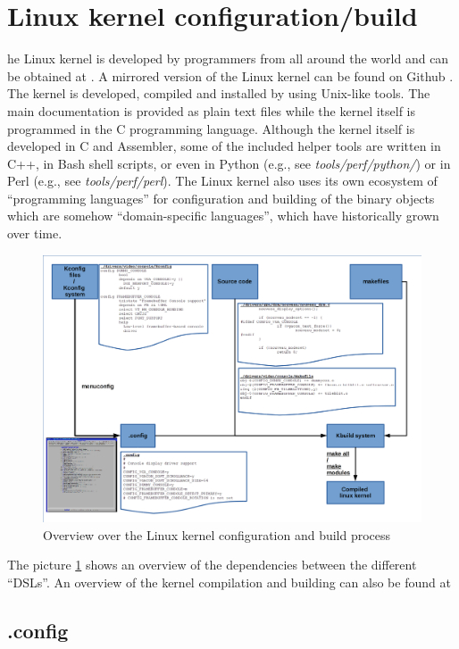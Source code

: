 \section{Linux kernel configuration/build}
he Linux kernel is developed by programmers from all around the world 
and can be obtained at \cite{Kernel_1}.
A mirrored version of the Linux kernel can be found on Github \cite{Kernel_2}.
The kernel is developed, compiled and installed by using Unix-like tools.
The main documentation is provided as plain text files while the kernel itself is programmed 
in the C programming language. Although the kernel itself is developed in C and Assembler,
some of the included helper tools are written in C++, in Bash shell scripts, or even in Python 
(e.g., see {\it tools/perf/python/}) or in Perl (e.g., see {\it tools/perf/perl}).
The Linux kernel also uses its own ecosystem of ``programming languages'' for configuration and 
building of the binary objects which are somehow ``domain-specific languages'', 
which have historically grown over time. 
\begin{figure}[ht]
  \centering
  \includegraphics[scale=0.4]{images/overview}
  \caption{Overview over the Linux kernel configuration and build process}
  \label{fig:overview}
\end{figure}

The picture \ref{fig:overview} shows an overview of the dependencies between the different ``DSLs''.
An overview of the kernel compilation and building can also be found at 
\cite{Kernel_3}
\FloatBarrier

\subsection{.config}

